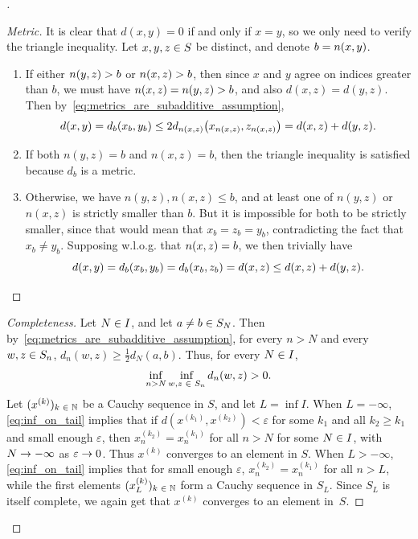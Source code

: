 \documentclass[10pt]{amsart}
\theoremstyle{definition}\newtheorem{defi}[theo]{Definition}\newtheorem{rema}[theo]{Remark}\newtheorem{exam}[theo]{Example}\newtheorem{exem}[theo]{Example}\newtheorem{nota}[theo]{Notation}
\newcommand*\n{\mathbb{N}}
\newcommand*\eps{\varepsilon}
\newcommand*\indexx[2]{n\left(#1,#2\right)}
\let\originalleft\left
\let\originalright\right
\renewcommand{\left}{\mathopen{}\mathclose\bgroup\originalleft}
\renewcommand{\right}{\aftergroup\egroup\originalright}
\renewcommand*{\to}{\mathchoice{\longrightarrow}{\rightarrow}{\rightarrow}{\rightarrow}}
\let\oldin\in
\renewcommand{\in}{\mathchoice{\oldin}{\oldin}{\,\oldin\,}{\,\oldin\,}}
\newenvironment{proofc}[1][\proofname]{\begin{proof}[#1]}{\end{proof}}
\begin{document}
\begin{proofc}
\begin{proof}[{Metric}]
It is clear that $d(x,y)=0$ if and only if $x=y$, so we only need to verify the triangle inequality. Let $x,y,z\in S$ be distinct, and denote $b=\indexx xy$.
\begin{enumerate}
\item If either $\indexx yz>b$ or $\indexx xz>b$, then since $x$ and $y$ agree on indices greater than $b$, we must have $\indexx xz=\indexx yz>b$, and also $d(x,z)=d(y,z)$. Then by~\eqref{eq:metrics_are_subadditive_assumption},
\[
d\left(x,y\right)=d_{b}\left(x_{b},y_{b}\right)\leq2d_{\indexx xz}\left(x_{\indexx xz},z_{\indexx xz}\right)=d\left(x,z\right)+d\left(y,z\right).
\]
\item If both $n(y,z)=b$ and $n(x,z)=b$, then the triangle inequality is satisfied because $d_{b}$ is a metric.
\item Otherwise, we have $n(y,z),n(x,z)\leq b$, and at least one of $n(y,z)$ or $n(x,z)$ is strictly smaller than $b.$ But it is impossible for both to be strictly smaller, since that would mean that $x_{b}=z_{b}=y_{b}$, contradicting the fact that $x_{b}\neq y_{b}$. Supposing w.l.o.g. that $\indexx xz=b$, we then trivially have
\[
d\left(x,y\right)=d_{b}\left(x_{b},y_{b}\right)=d_{b}\left(x_{b},z_{b}\right)=d\left(x,z\right)\leq d\left(x,z\right)+d\left(y,z\right).
\]
\end{enumerate}
\let\qed\relax
\end{proof}
\begin{proof}[{Completeness}]
Let $N\in I$, and let $a\neq b\in S_{N}$. Then by~\eqref{eq:metrics_are_subadditive_assumption}, for every $n>N$ and every $w,z\in S_{n}$, $d_{n}(w,z)\geq\frac{1}{2}d_{N}(a,b)$. Thus, for every $N\in I$,
\begin{equation}
\inf_{n>N}\inf_{w,z\in S_{n}}d_{n}\left(w,z\right)>0.\label{eq:inf_on_tail}
\end{equation}
Let $(x^{(k)})_{k\in\n}$ be a Cauchy sequence in $S$, and let $L=\inf I$. When $L=-\infty$, \eqref{eq:inf_on_tail} implies that if $d(x^{(k_{1})},x^{(k_{2})})<\eps$ for some $k_{1}$ and all $k_{2}\geq k_{1}$ and small enough $\eps$, then $x_{n}^{(k_{2})}=x_{n}^{(k_{1})}$ for all $n>N$ for some $N\in I$, with $N\to-\infty$ as $\eps\to0$. Thus $x^{(k)}$ converges to an element in $S$. When $L>-\infty$, \eqref{eq:inf_on_tail} implies that for small enough $\eps$, $x_{n}^{(k_{2})}=x_{n}^{(k_{1})}$ for all $n>L$, while the first elements $(x_{L}^{(k)})_{k\in\n}$ form a Cauchy sequence in $S_{L}$. Since $S_{L}$ is itself complete, we again get that $x^{(k)}$ converges to an element in~$S$.\let\qed\relax

\end{proof}
\end{proofc}
\end{document}
